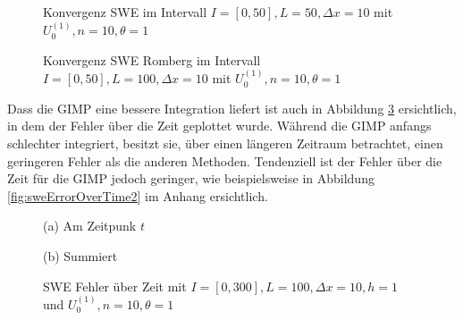 \begin{figure}
\centering

\caption{Konvergenz SWE im Intervall $I = [0,50], L=50, \Delta x=10$ mit $U_0^{(1)},n=10,\theta=1$}
\label{fig:sweConvergence}
\end{figure}

\begin{figure}
\centering

\caption{Konvergenz SWE Romberg im Intervall $I = [0,50], L=100, \Delta x=10$ mit $U_0^{(1)},n=10,\theta=1$}
\label{fig:sweConvergenceRomberg}
\end{figure}
Dass die GIMP eine bessere Integration liefert ist auch in Abbildung \ref{fig:sweErrorOverTime} ersichtlich, in dem der Fehler über die Zeit geplottet wurde. Während die GIMP anfangs schlechter integriert, besitzt sie, über einen längeren Zeitraum betrachtet, einen geringeren Fehler als die anderen Methoden. Tendenziell ist der Fehler über die Zeit für die GIMP jedoch geringer, wie beispielsweise in Abbildung \ref{fig:sweErrorOverTime2} im Anhang ersichtlich.

\begin{figure}
\footnotesize
\begin{minipage}[b]{0.49\linewidth}
\centering

% 
\caption*{(a) Am Zeitpunk $t$}
\end{minipage}
\begin{minipage}[b]{0.49\linewidth}
\centering
% 

\caption*{(b) Summiert}
\end{minipage}
\caption{SWE Fehler über Zeit mit $I=[0,300], L=100, \Delta x=10, h = 1$ und $U_0^{(1)},n=10,\theta=1$}
\label{fig:sweErrorOverTime}
\end{figure}
% 
